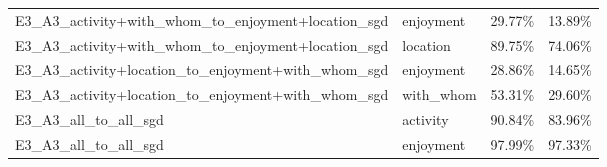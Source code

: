 \begin{tabular}{llll}
E3\_A3\_activity+with\_whom\_to\_enjoyment+location\_sgd & enjoyment & 29.77\% & 13.89\% \\
E3\_A3\_activity+with\_whom\_to\_enjoyment+location\_sgd & location & 89.75\% & 74.06\% \\
E3\_A3\_activity+location\_to\_enjoyment+with\_whom\_sgd & enjoyment & 28.86\% & 14.65\% \\
E3\_A3\_activity+location\_to\_enjoyment+with\_whom\_sgd & with_whom & 53.31\% & 29.60\% \\
E3\_A3\_all\_to\_all\_sgd & activity & 90.84\% & 83.96\% \\
E3\_A3\_all\_to\_all\_sgd & enjoyment & 97.99\% & 97.33\% \\
\bottomrule
\end{tabular}
